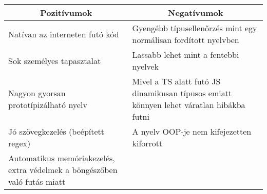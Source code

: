 \begin{center}
  \begin{tabularx}{\textwidth}{X X}
    \hline
    \multicolumn{1}{c}{\bfseries{Pozitívumok}} & \multicolumn{1}{c}{\bfseries{Negatívumok}}                                               \\
    \hline
    Natívan az interneten futó kód             & Gyengébb típusellenőrzés mint egy normálisan fordított nyelvben                          \\
    Sok személyes tapasztalat                  & Lassabb lehet mint a fentebbi nyelvek                                                    \\
    Nagyon gyorsan prototípizálható nyelv      & Mivel a TS alatt futó JS dinamikusan típusos emiatt könnyen lehet váratlan hibákba futni \\
    Jó szövegkezelés (beépített regex)         & A nyelv OOP-je nem kifejezetten kiforrott                                                \\
    Automatikus memóriakezelés, extra védelmek a böngészőben való futás miatt                                                             \\
    \hline
  \end{tabularx}
\end{center}